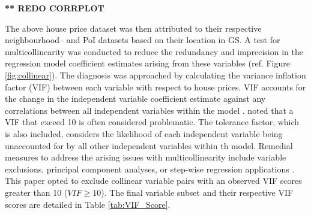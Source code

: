 \textbf{** REDO CORRPLOT}

The above house price dataset was then attributed to their respective neighbourhood-- and PoI datasets based on their location in GS. A test for multicollinearity was conducted to reduce the redundancy and imprecision in the regression model coefficient estimates arising from these variables (ref. Figure \ref{fig:collinear}). The diagnosis was approached by calculating the variance inflation factor (VIF) between each variable with respect to house prices. VIF accounts for the change in the independent variable coefficient estimate against any correlations between all independent variables within the model \citep{gareth2013introduction}.  \cite{gareth2013introduction} noted that a VIF that exceed 10 is often considered problematic. The tolerance factor, which is also included, considers the likelihood of each independent variable being unaccounted for by all other independent variables within th model. Remedial measures to address the arising issues with multicollinearity include variable exclusions, principal component analyses, or step-wise regression applications \citep{bruce2020practical}. This paper opted to exclude collinear variable pairs with an observed VIF scores greater than 10 ($VIF \geq 10$). The final variable subset and their respective VIF scores are detailed in Table \ref{tab:VIF_Score}.\\

